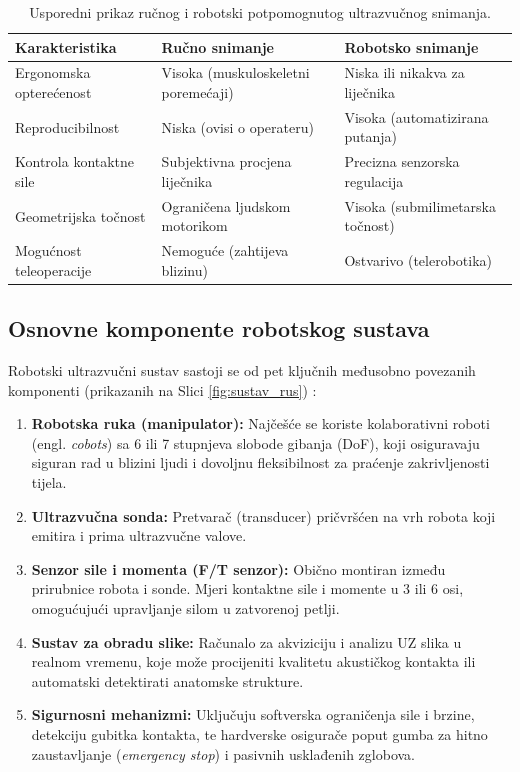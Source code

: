 \begin{table}[H]
\centering
\caption{Usporedni prikaz ručnog i robotski potpomognutog ultrazvučnog snimanja.}
\label{tab:razlike_rucno_robotsko}
\begin{tabular}{p{} p{} p{}}
\toprule
\textbf{Karakteristika} & \textbf{Ručno snimanje} & \textbf{Robotsko snimanje} \\
\midrule
Ergonomska opterećenost & Visoka (muskuloskeletni poremećaji) & Niska ili nikakva za liječnika \\
Reproducibilnost & Niska (ovisi o operateru) & Visoka (automatizirana putanja) \\
Kontrola kontaktne sile & Subjektivna procjena liječnika & Precizna senzorska regulacija \\
Geometrijska točnost & Ograničena ljudskom motorikom & Visoka (submilimetarska točnost) \\
Mogućnost teleoperacije & Nemoguće (zahtijeva blizinu) & Ostvarivo (telerobotika) \\
\bottomrule
\end{tabular}
\end{table}

\subsection{Osnovne komponente robotskog sustava}
Robotski ultrazvučni sustav sastoji se od pet ključnih međusobno povezanih komponenti (prikazanih na Slici \ref{fig:sustav_rus}) \cite{vonhaxthausen2021medical, ieee2025survey}:
\begin{enumerate}
    \item \textbf{Robotska ruka (manipulator):} Najčešće se koriste kolaborativni roboti (engl. \textit{cobots}) sa 6 ili 7 stupnjeva slobode gibanja (DoF), koji osiguravaju siguran rad u blizini ljudi i dovoljnu fleksibilnost za praćenje zakrivljenosti tijela.
    \item \textbf{Ultrazvučna sonda:} Pretvarač (transducer) pričvršćen na vrh robota koji emitira i prima ultrazvučne valove.
    \item \textbf{Senzor sile i momenta (F/T senzor):} Obično montiran između prirubnice robota i sonde. Mjeri kontaktne sile i momente u 3 ili 6 osi, omogućujući upravljanje silom u zatvorenoj petlji.
    \item \textbf{Sustav za obradu slike:} Računalo za akviziciju i analizu UZ slika u realnom vremenu, koje može procijeniti kvalitetu akustičkog kontakta ili automatski detektirati anatomske strukture.
    \item \textbf{Sigurnosni mehanizmi:} Uključuju softverska ograničenja sile i brzine, detekciju gubitka kontakta, te hardverske osigurače poput gumba za hitno zaustavljanje (\textit{emergency stop}) i pasivnih usklađenih zglobova.
\end{enumerate}

